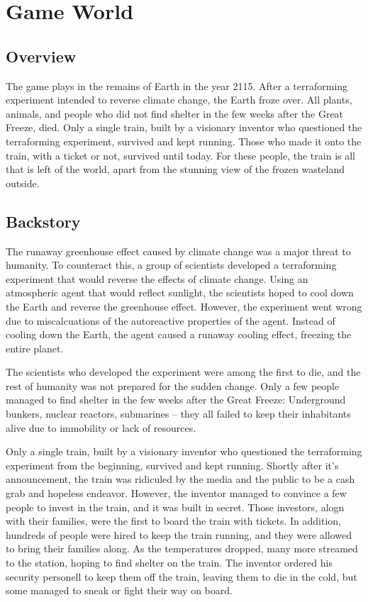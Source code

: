 \chapter{Game World}\label{ch:game-world}

\section{Overview}

The game plays in the remains of Earth in the year 2115.
After a terraforming experiment intended to reverse climate change, the Earth froze over.
All plants, animals, and people who did not find shelter in the few weeks after the Great Freeze, died.
Only a single train, built by a visionary inventor who questioned the terraforming experiment, survived and kept running.
Those who made it onto the train, with a ticket or not, survived until today.
For these people, the train is all that is left of the world, apart from the stunning view of the frozen wasteland outside.

\section{Backstory}

The runaway greenhouse effect caused by climate change was a major threat to humanity.
To counteract this, a group of scientists developed a terraforming experiment that would reverse the effects of climate change.
Using an atmospheric agent that would reflect sunlight, the scientists hoped to cool down the Earth and reverse the greenhouse effect.
However, the experiment went wrong due to miscalcuations of the autoreactive properties of the agent.
Instead of cooling down the Earth, the agent caused a runaway cooling effect, freezing the entire planet.

The scientists who developed the experiment were among the first to die, and the rest of humanity was not prepared for the sudden change.
Only a few people managed to find shelter in the few weeks after the Great Freeze:
Underground bunkers, nuclear reactors, submarines -- they all failed to keep their inhabitants alive due to immobility or lack of resources.

Only a single train, built by a visionary inventor who questioned the terraforming experiment from the beginning, survived and kept running.
Shortly after it's announcement, the train was ridiculed by the media and the public to be a cash grab and hopeless endeavor.
However, the inventor managed to convince a few people to invest in the train, and it was built in secret.
Those investors, alogn with their families, were the first to board the train with tickets.
In addition, hundreds of people were hired to keep the train running, and they were allowed to bring their families along.
As the temperatures dropped, many more streamed to the station, hoping to find shelter on the train.
The inventor ordered his security personell to keep them off the train, leaving them to die in the cold, but some managed to sneak or fight their way on board.

